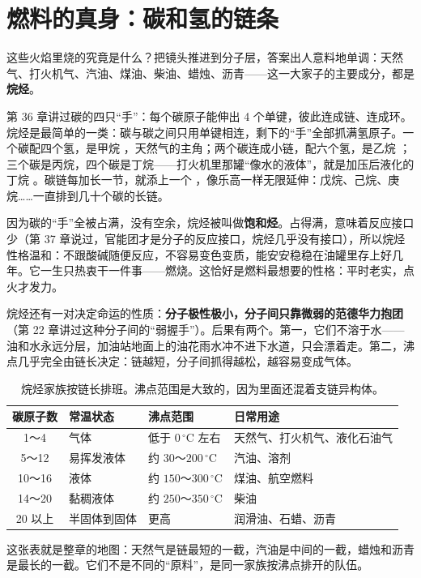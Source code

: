 \section{燃料的真身：碳和氢的链条}

这些火焰里烧的究竟是什么？把镜头推进到分子层，答案出人意料地单调：天然气、打火机气、汽油、煤油、柴油、蜡烛、沥青——这一大家子的主要成分，都是\textbf{烷烃}。

第 36 章讲过碳的四只“手”：每个碳原子能伸出 4 个单键，彼此连成链、连成环。烷烃是最简单的一类：碳与碳之间只用单键相连，剩下的“手”全部抓满氢原子。一个碳配四个氢，是甲烷 ，天然气的主角；两个碳连成小链，配六个氢，是乙烷 ；三个碳是丙烷，四个碳是丁烷——打火机里那罐“像水的液体”，就是加压后液化的丁烷 。碳链每加长一节，就添上一个 ，像乐高一样无限延伸：戊烷、己烷、庚烷……一直排到几十个碳的长链。

因为碳的“手”全被占满，没有空余，烷烃被叫做\textbf{饱和烃}。占得满，意味着反应接口少（第 37 章说过，官能团才是分子的反应接口，烷烃几乎没有接口），所以烷烃性格温和：不跟酸碱随便反应，不容易变色变质，能安安稳稳在油罐里存上好几年。它一生只热衷干一件事——燃烧。这恰好是燃料最想要的性格：平时老实，点火才发力。

烷烃还有一对决定命运的性质：\textbf{分子极性极小，分子间只靠微弱的范德华力抱团}（第 22 章讲过这种分子间的“弱握手”）。后果有两个。第一，它们不溶于水——油和水永远分层，加油站地面上的油花雨水冲不进下水道，只会漂着走。第二，沸点几乎完全由链长决定：链越短，分子间抓得越松，越容易变成气体。

\begin{table}[h]
\centering
\begin{tabular}{clll}
\toprule
碳原子数 & 常温状态 & 沸点范围 & 日常用途 \\
\midrule
1～4 & 气体 & 低于 $0\,^{\circ}\mathrm{C}$ 左右 & 天然气、打火机气、液化石油气 \\
5～12 & 易挥发液体 & 约 $30$～$200\,^{\circ}\mathrm{C}$ & 汽油、溶剂 \\
10～16 & 液体 & 约 $150$～$300\,^{\circ}\mathrm{C}$ & 煤油、航空燃料 \\
14～20 & 黏稠液体 & 约 $250$～$350\,^{\circ}\mathrm{C}$ & 柴油 \\
20 以上 & 半固体到固体 & 更高 & 润滑油、石蜡、沥青 \\
\bottomrule
\end{tabular}
\caption{烷烃家族按链长排班。沸点范围是大致的，因为里面还混着支链异构体。}
\end{table}

这张表就是整章的地图：天然气是链最短的一截，汽油是中间的一截，蜡烛和沥青是最长的一截。它们不是不同的“原料”，是同一家族按沸点排开的队伍。

